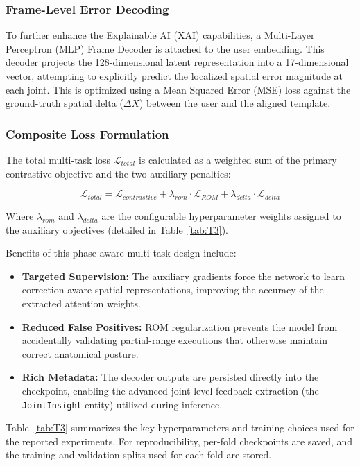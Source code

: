 \subsubsection*{Frame-Level Error Decoding}
To further enhance the Explainable AI (XAI) capabilities, a Multi-Layer Perceptron (MLP) Frame Decoder is attached to the user embedding. This decoder projects the 128-dimensional latent representation into a 17-dimensional vector, attempting to explicitly predict the localized spatial error magnitude at each joint. This is optimized using a Mean Squared Error (MSE) loss against the ground-truth spatial delta ($\Delta X$) between the user and the aligned template.

\subsubsection*{Composite Loss Formulation}
The total multi-task loss $\mathcal{L}_{total}$ is calculated as a weighted sum of the primary contrastive objective and the two auxiliary penalties:

\begin{equation}
\mathcal{L}_{total} = \mathcal{L}_{contrastive} + \lambda_{rom} \cdot \mathcal{L}_{ROM} + \lambda_{delta} \cdot \mathcal{L}_{delta}
\end{equation}

Where $\lambda_{rom}$ and $\lambda_{delta}$ are the configurable hyperparameter weights assigned to the auxiliary objectives (detailed in Table~\ref{tab:T3}).

Benefits of this phase-aware multi-task design include:
\begin{itemize}
    \item \textbf{Targeted Supervision:} The auxiliary gradients force the network to learn correction-aware spatial representations, improving the accuracy of the extracted attention weights.
    \item \textbf{Reduced False Positives:} ROM regularization prevents the model from accidentally validating partial-range executions that otherwise maintain correct anatomical posture.
    \item \textbf{Rich Metadata:} The decoder outputs are persisted directly into the checkpoint, enabling the advanced joint-level feedback extraction (the \texttt{JointInsight} entity) utilized during inference.
\end{itemize}

Table~\ref{tab:T3} summarizes the key hyperparameters and training choices used for the reported experiments. For reproducibility, per-fold checkpoints are saved, and the training and validation splits used for each fold are stored.

